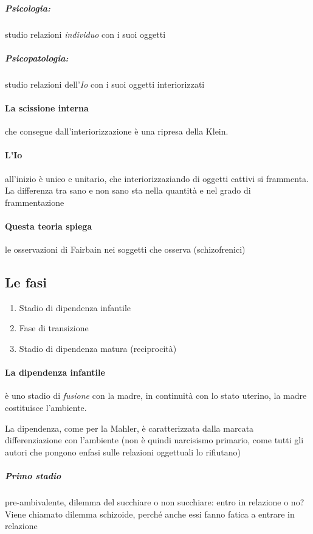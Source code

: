 \documentclass[12pt, a4paper]{article}
\begin{document}
\subparagraph{Psicologia:} studio relazioni \emph{individuo} con i suoi oggetti
\subparagraph{Psicopatologia:} studio relazioni dell'\emph{Io} con i suoi oggetti interiorizzati

\paragraph{La scissione interna} che consegue dall'interiorizzazione \`e una ripresa della Klein.

\paragraph{L'Io} all'inizio \`e unico e unitario, che interiorizzaziando di oggetti cattivi si frammenta. La differenza tra sano e non sano sta nella quantit\`a e nel grado di frammentazione

\paragraph{Questa teoria spiega} le osservazioni di Fairbain nei soggetti che osserva (schizofrenici)


\subsection{Le fasi}

\begin{enumerate}
    \item Stadio di dipendenza infantile
    \item Fase di transizione
    \item Stadio di dipendenza matura (reciprocit\`a)
\end{enumerate}

\paragraph{La dipendenza infantile} \`e uno stadio di \emph{fusione} con la madre, in continuit\`a con lo stato uterino, la madre costituisce l'ambiente.

La dipendenza, come per la Mahler, \`e caratterizzata dalla marcata differenziazione con l'ambiente (non \`e quindi narcisismo primario, come tutti gli autori che pongono enfasi sulle relazioni oggettuali lo rifiutano)

\subparagraph{Primo stadio} pre-ambivalente, dilemma del succhiare o non succhiare: entro in relazione o no? Viene chiamato dilemma schizoide, perch\'e anche essi fanno fatica a entrare in relazione
\end{document}
